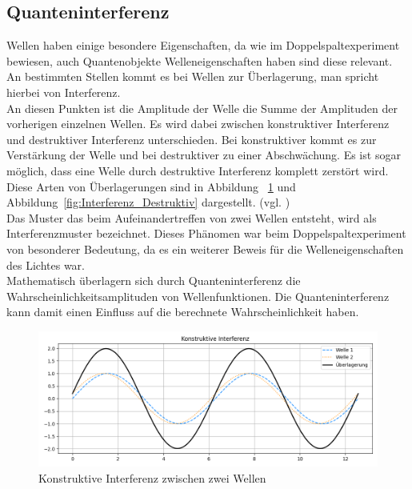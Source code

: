\subsection{Quanteninterferenz}
\label{sec: Quanteninterferenz}

Wellen haben einige besondere Eigenschaften, da wie im Doppelspaltexperiment bewiesen, auch Quantenobjekte Welleneigenschaften haben sind diese relevant. An bestimmten Stellen kommt es bei Wellen zur Überlagerung, man spricht hierbei von Interferenz.\\
An diesen Punkten ist die Amplitude der Welle die Summe der Amplituden der vorherigen einzelnen Wellen. Es wird dabei zwischen konstruktiver Interferenz und destruktiver Interferenz unterschieden. Bei konstruktiver kommt es zur Verstärkung der Welle und bei destruktiver zu einer Abschwächung. Es ist sogar möglich, dass eine Welle durch destruktive Interferenz komplett zerstört wird. Diese Arten von Überlagerungen sind in Abbildung ~\ref{fig:Interferenz_Konstruktiv} und Abbildung~\ref{fig:Interferenz_Destruktiv} dargestellt. (vgl. \cite[Ch. 2.1.3]{schmitz_particles_2022})\\
Das Muster das beim Aufeinandertreffen von zwei Wellen entsteht, wird als Interferenzmuster bezeichnet. Dieses Phänomen war beim Doppelspaltexperiment von besonderer Bedeutung, da es ein weiterer Beweis für die Welleneigenschaften des Lichtes war.\\
Mathematisch überlagern sich durch Quanteninterferenz die Wahrscheinlichkeitsamplituden von Wellenfunktionen. Die Quanteninterferenz kann damit einen Einfluss auf die berechnete Wahrscheinlichkeit haben.
\\
\begin{figure}[H]
    \centering
    \includegraphics[width=1\linewidth]{images/physics/Interferenz_Konstruktiv.png}
    \caption{Konstruktive Interferenz zwischen zwei Wellen}
    \label{fig:Interferenz_Konstruktiv}
\end{figure}

